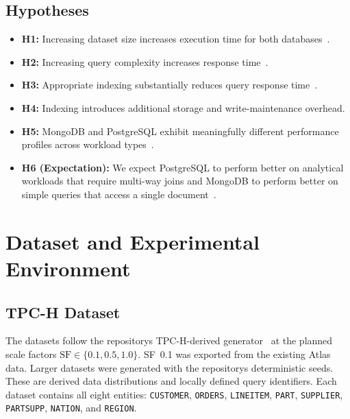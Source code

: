\documentclass[10pt,a4paper,twocolumn]{article}
\begin{document}
\subsection{Hypotheses}
\begin{itemize}
  \item \textbf{H1:} Increasing dataset size increases execution time for both
        databases~\cite{gyorodi2015comparative,truica2015performance}.
  \item \textbf{H2:} Increasing query complexity increases response
        time~\cite{chaudhuri1998overview}.
  \item \textbf{H3:} Appropriate indexing substantially reduces query response
        time~\cite{graefe2011modern}.
  \item \textbf{H4:} Indexing introduces additional storage and write-maintenance overhead.
  \item \textbf{H5:} MongoDB and PostgreSQL exhibit meaningfully different performance
        profiles across workload types~\cite{stonebraker2005c}.
  \item \textbf{H6 (Expectation):} We expect PostgreSQL to perform better on analytical workloads that require multi-way joins and MongoDB to perform better on simple queries that access a single document~\cite{gessert2017nosql}.
\end{itemize}

\section{Dataset and Experimental Environment}

\subsection{TPC-H Dataset}
The datasets follow the repository\textquotesingle s TPC-H-derived generator~\cite{tpch_spec,poess2000tpch} at the planned scale factors $\mathrm{SF}\in\{0.1,0.5,1.0\}$. SF~0.1 was exported from the existing Atlas data. Larger datasets were generated with the repository\textquotesingle s deterministic seeds. These are derived data distributions and locally defined query identifiers. Each dataset contains all eight entities: \texttt{CUSTOMER}, \texttt{ORDERS}, \texttt{LINEITEM}, \texttt{PART}, \texttt{SUPPLIER}, \texttt{PARTSUPP}, \texttt{NATION}, and \texttt{REGION}.
\end{document}
